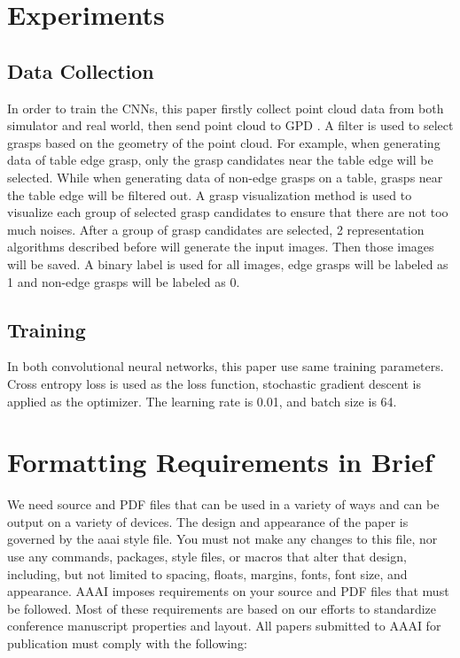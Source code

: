 \documentclass[letterpaper]{article} %
\begin{document}
\section{Experiments}
\subsection{Data Collection}
In order to train the CNNs, this paper firstly collect point cloud data from both simulator and real world, then send point cloud to GPD \cite{RN6}. A filter is used to select grasps based on the geometry of the point cloud. For example, when generating data of table edge grasp, only the grasp candidates near the table edge will be selected. While when generating data of non-edge grasps on a table, grasps near the table edge will be filtered out. A grasp visualization method is used to visualize each group of selected grasp candidates to ensure that there are not too much noises. After a group of grasp candidates are selected, 2 representation algorithms described before will generate the input images. Then those images will be saved. A binary label is used for all images, edge grasps will be labeled as 1 and non-edge grasps will be labeled as 0.
\subsection{Training}
In both convolutional neural networks, this paper use same training parameters. Cross entropy loss is used as the loss function, stochastic gradient descent is applied as the optimizer. The learning rate is 0.01, and batch size is 64.


\clearpage
\section{Formatting Requirements in Brief}
We need source and PDF files that can be used in a variety of ways and can be output on a variety of devices. The design and appearance of the paper is governed by the aaai style file. You must not make any changes to this file, nor use any commands, packages, style files, or macros that alter that design, including, but not limited to spacing, floats, margins, fonts, font size, and appearance. AAAI imposes  requirements on your source and PDF files that must be followed. Most of these requirements are based on our efforts to standardize conference manuscript properties and layout. All papers submitted to AAAI for publication must comply with the following:
\end{document}

